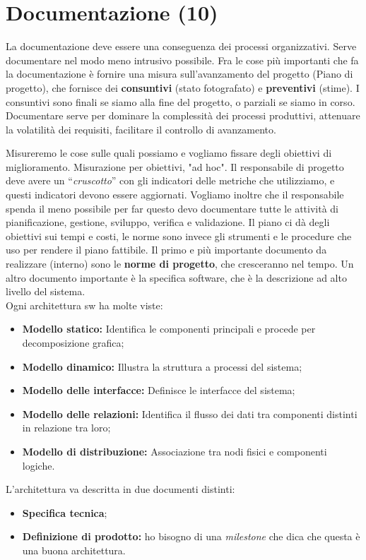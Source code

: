 



\section{Documentazione (10)}

La documentazione deve essere una conseguenza dei processi organizzativi. Serve documentare nel modo meno intrusivo possibile. Fra le cose più importanti che fa la documentazione è fornire una misura sull'avanzamento del progetto (Piano di progetto), che fornisce dei \textbf{consuntivi} (stato fotografato) e \textbf{preventivi} (stime). I consuntivi sono finali se siamo alla fine del progetto, o parziali se siamo in corso. Documentare serve per dominare la complessità dei processi produttivi, attenuare la volatilità dei requisiti, facilitare il controllo di avanzamento.

Misureremo le cose sulle quali possiamo e vogliamo fissare degli obiettivi di miglioramento. Misurazione per obiettivi, "ad hoc". Il responsabile di progetto deve avere un ``\textit{cruscotto}'' con gli indicatori delle metriche che utilizziamo, e questi indicatori devono essere aggiornati. Vogliamo inoltre che il responsabile spenda il meno possibile per far questo devo documentare tutte le attività di pianificazione, gestione, sviluppo, verifica e validazione. Il piano ci dà degli obiettivi sui tempi e costi, le norme sono invece gli strumenti e le procedure che uso per rendere il piano fattibile. Il primo e più importante documento da realizzare (interno) sono le \textbf{norme di progetto}, che cresceranno nel tempo. Un altro documento importante è la specifica software, che è la descrizione ad alto livello del sistema.\\
Ogni architettura sw ha molte viste:

\begin{itemize}

	\item \textbf{Modello statico:} Identifica le componenti principali e procede per decomposizione grafica;
	\item \textbf{Modello dinamico:} Illustra la struttura a processi del sistema;
	\item \textbf{Modello delle interfacce:} Definisce le interfacce  del sistema;
	\item \textbf{Modello delle relazioni:} Identifica il flusso dei dati tra componenti distinti in relazione tra loro;
	\item \textbf{Modello di distribuzione:} Associazione tra nodi fisici e componenti logiche.

\end{itemize}

L'architettura va descritta in due documenti distinti:

\begin{itemize}

	\item \textbf{Specifica tecnica};
	\item \textbf{Definizione di prodotto:} ho bisogno di una \textit{milestone} che dica che questa è una buona architettura.

\end{itemize}
